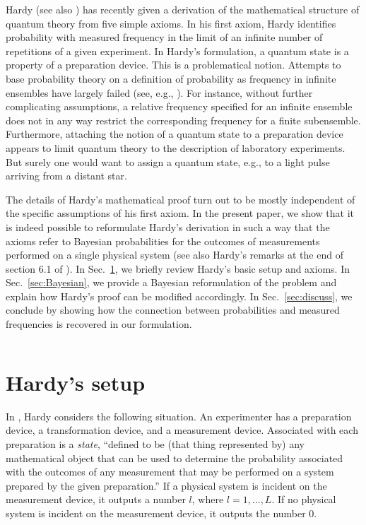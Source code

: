 \documentclass[pra,12pt,tightenlines]{revtex4-2}
\begin{document}
Hardy \cite{Hardy-0101} (see also \cite{Hardy-0111}) has recently given a
derivation of the mathematical structure of quantum theory from five simple
axioms. In his first axiom, Hardy identifies probability with measured
frequency in the limit of an infinite number of repetitions of a given
experiment. In Hardy's formulation, a quantum state is a property of a
preparation device. This is a problematical notion. Attempts to base
probability theory on a definition of probability as frequency in infinite
ensembles \cite{VonMises1957} have largely failed (see, e.g.,
\cite{vanFraassen1977,Jaynes2003}). For instance,
without further complicating assumptions, a relative frequency specified for
an infinite ensemble does not in any way restrict the corresponding frequency
for a finite subensemble. Furthermore, attaching the notion of a quantum state
to a preparation device appears to limit quantum theory to the description of
laboratory experiments. But surely one would want to assign a quantum state,
e.g., to a light pulse arriving from a distant star.

The details of Hardy's mathematical proof turn out to be mostly independent of
the specific assumptions of his first axiom. In the present paper, we show
that it is indeed possible to reformulate Hardy's derivation in such a way
that the axioms refer to Bayesian probabilities for the outcomes of
measurements performed on a single physical system (see also Hardy's remarks
at the end of section 6.1 of \cite{Hardy-0101}). In Sec.~\ref{sec:Hardy}, we
briefly review Hardy's basic setup and axioms. In Sec.~\ref{sec:Bayesian}, we
provide a Bayesian reformulation of the problem and explain how Hardy's proof
can be modified accordingly. In Sec.~\ref{sec:discuss}, we conclude by showing
how the connection between probabilities and measured frequencies is
recovered in our formulation.

$\;$ \section{Hardy's setup}  \label{sec:Hardy}

In \cite{Hardy-0101},  Hardy considers the following situation. An
experimenter has a preparation device, a transformation device, and a
measurement device.  Associated with each preparation is a {\it state},
``defined to be (that thing represented by) any mathematical object that can
be used to determine the probability associated with the outcomes of any
measurement that may be performed on a system prepared by the given
preparation.''  If a physical system is incident on the measurement device, it
outputs a number $l$, where $l=1,\ldots,L$. If no physical system is incident
on the measurement device, it outputs the number 0.
\end{document}
